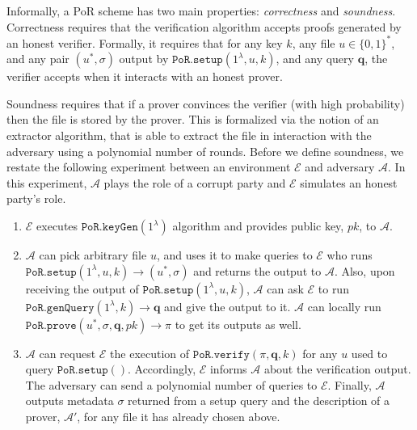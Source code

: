 Informally, a PoR scheme has two main properties: \emph{correctness} and \emph{soundness}. Correctness requires that the verification algorithm accepts  proofs generated by an honest verifier. Formally, it requires that for any key $k$, any file $u\in\{0,1\}^{\scriptscriptstyle *}$, and any  pair $(u^{*},\sigma)$ output by $\mathtt{PoR.setup}(1^{\scriptscriptstyle\lambda}, u,k)$, and any query $\bm{q}$, the verifier  accepts when it interacts with an honest prover.

 Soundness requires that if a prover convinces the verifier (with high probability) then the file is stored by the prover. This is formalized via the notion of an extractor algorithm, that is able to extract the file in interaction with the adversary using a polynomial number of  rounds. Before we define  soundness, we restate the following experiment between an environment $\mathcal{E}$ and  adversary $\mathcal{A}$. In this experiment, $\mathcal{A}$ plays the role of a corrupt party and $\mathcal{E}$ simulates an honest party's role. 


\begin{enumerate}
\item $\mathcal{E}$ executes $\mathtt{PoR.keyGen}(1^{\scriptscriptstyle\lambda})$ algorithm and provides public key, $pk$, to $\mathcal{A}$.   
\item $\mathcal{A}$ can pick  arbitrary file $u$, and  uses it to make queries to  $\mathcal{E}$ who runs  $\mathtt{PoR.setup}(1^{\scriptscriptstyle\lambda}, u,k)\rightarrow (u^{\scriptscriptstyle *}, \sigma)$   and returns the output to $\mathcal{A}$. Also, upon receiving the output of $\mathtt{PoR.setup}(1^{\scriptscriptstyle\lambda}, u,k)$, $\mathcal{A}$ can ask $\mathcal{E}$  to run   $\mathtt{PoR.genQuery}(1^{\scriptscriptstyle\lambda},k)\rightarrow \bm{q}$ and give the output to it. $\mathcal{A}$ can locally run $\mathtt{PoR.prove}(u^{\scriptscriptstyle *}, \sigma, \bm{q},pk)\rightarrow \pi$ to get its outputs as well. 
\item $\mathcal{A}$ can request $\mathcal{E}$ the execution of $\mathtt{PoR.verify}(\pi,\bm{q},k)$ for any $u$ used to query $\mathtt{PoR.setup}()$. Accordingly, $\mathcal{E}$ informs  $\mathcal{A}$ about the verification output. The adversary can send a polynomial number of queries to $\mathcal{E}$. Finally, $\mathcal{A}$ outputs metadata $\sigma$ returned from a setup query and the description of a prover, $\mathcal{A}'$, for any file it has already chosen above. 
\end{enumerate}

